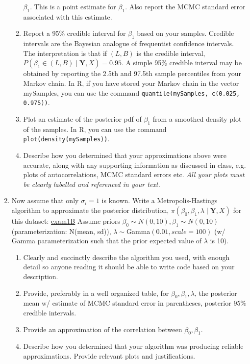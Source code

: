 \message{ !name(takehome15.tex)}\documentclass[11pt]{article}
\begin{document}
\begin{enumerate}
\begin{enumerate}
  $\beta_1$. This is a point estimate for $\beta_1$. Also report the
  MCMC standard error associated with this estimate.
\item Report a 95\% credible interval for $\beta_1$ based on your
  samples. Credible intervals are the Bayesian analogue of frequentist
  confidence intervals. The interpretation is that if $(L,B)$ is the
  credible interval, $P(\beta_1 \in (L,B)\mid {\mathbf Y, X})=0.95$. A
  simple 95\% credible interval may be obtained by reporting the 2.5th
  and 97.5th sample percentiles from your Markov chain. In R, if you
  have stored your Markov chain in the vector mySamples, you can use
  the command {\tt quantile(mySamples, c(0.025, 0.975))}.
\item Plot an estimate of the posterior pdf of $\beta_1$ from a
  smoothed density plot of the samples. In R, you can use the command
 {\tt plot(density(mySamples))}.
\item Describe how you determined that your approximations above were 
  accurate, along with any supporting information as discussed in
  class, e.g. plots of autocorrelations, MCMC standard errors
  etc. {\it All your plots must be clearly labelled and referenced in
    your text.}
\end{enumerate}

\item Now assume that only $\sigma_i=1$ is known. Write a
  Metropolis-Hastings algorithm to approximate the posterior
  distribution, $\pi(\beta_0, \beta_1, \lambda\mid {\mathbf Y, X})$
  for this dataset: \url{exam1B} Assume priors $\beta_0\sim
  N(0,10), \beta_1\sim N(0,10)$ (parameterization: N(mean, sd)), $\lambda \sim
  $Gamma$(0.01, scale=100)$ (w/ Gamma parameterization such that the
  prior expected value of $\lambda$ is 10).
\begin{enumerate}
\item Clearly and succinctly describe the algorithm you used, with
  enough detail so anyone reading it should be able to write code
  based on your description.
\item Provide, preferably in a well organized table, for $\beta_0,
  \beta_1, \lambda$, the posterior mean w/ estimate of MCMC standard
  error in parentheses, posterior 95\% credible intervals.
\item Provide an approximation of the correlation between $\beta_0,
  \beta_1$.
\item Describe how you determined that your algorithm was producing
  reliable approximations. Provide relevant plots and justifications.
\end{enumerate}
\end{enumerate}
\end{document}
